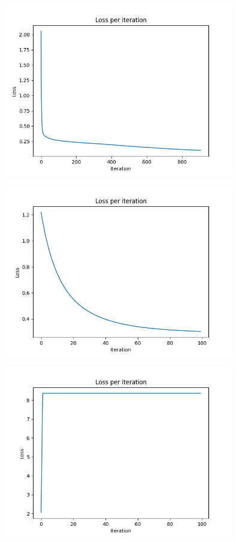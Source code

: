 \documentclass[12pt]{article}
\begin{document}
       \begin{center}
            \includegraphics[width=0.75\textwidth]{best-train.png}
        \end{center}
              \begin{center}
            \includegraphics[width=0.75\textwidth]{best-test.png}
        \end{center}
              \begin{center}
            \includegraphics[width=0.75\textwidth]{worst-train-test.png}
        \end{center}
\end{document}
